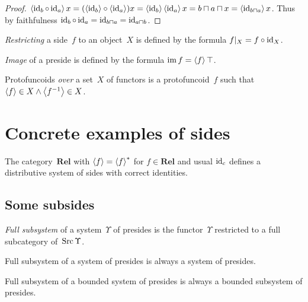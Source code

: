 \begin{proof}
$\left\langle \operatorname{id}_b\circ\operatorname{id}_a\right\rangle x = (\left\langle \operatorname{id}_b\right\rangle\circ\left\langle \operatorname{id}_a\right\rangle)x = \left\langle \operatorname{id}_b\right\rangle\left\langle \operatorname{id}_a\right\rangle x = b\sqcap a\sqcap x = \left\langle \operatorname{id}_{b\sqcap a}\right\rangle x$.
Thus by faithfulness $\operatorname{id}_b\circ\operatorname{id}_a = \operatorname{id}_{b\sqcap a} = \operatorname{id}_{a\sqcap b}$.
\end{proof}

\begin{defn}
\emph{Restricting} a side~$f$ to an object~$X$ is defined by the formula $f|_X = f\circ\operatorname{id}_X$.
\end{defn}

\begin{defn}
\emph{Image} of a preside is defined by the formula $\operatorname{im} f=\left\langle f\right\rangle\top$.
\end{defn}

\begin{defn}
Protofuncoids \emph{over} a set~$X$ of functors is a protofuncoid~$f$
such that $\left\langle f\right\rangle\in X\land\left\langle f^{-1}\right\rangle\in X$.
\end{defn}

\section{Concrete examples of sides}

\begin{obvious}
The category~$\mathbf{Rel}$ with $\left\langle f\right\rangle=\left\langle f\right\rangle ^{\ast}$ for $f\in\mathbf{Rel}$ and usual $\operatorname{id}_c$ defines a distributive system of sides with correct identities.
\end{obvious}

\subsection{Some subsides}

\begin{defn}
\emph{Full subsystem} of a system~$\Upsilon$ of presides is the functor~$\Upsilon$ restricted to a full subcategory of~$\operatorname{Src}\Upsilon$.
\end{defn}

\begin{obvious}
Full subsystem of a system of presides is always a system of presides.
\end{obvious}

\begin{obvious}
Full subsystem of a bounded system of presides is always a bounded subsystem of presides.
\end{obvious}

